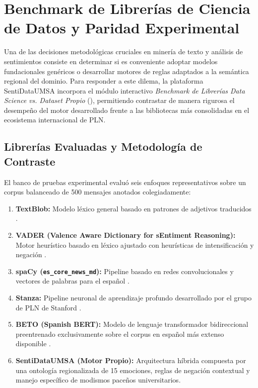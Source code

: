 \section{Benchmark de Librerías de Ciencia de Datos y Paridad Experimental}
\label{sec:benchmark_librerias}

Una de las decisiones metodológicas cruciales en minería de texto y análisis de sentimientos consiste en determinar si es conveniente adoptar modelos fundacionales genéricos o desarrollar motores de reglas adaptados a la semántica regional del dominio. Para responder a este dilema, la plataforma SentiDataUMSA incorpora el módulo interactivo \emph{Benchmark de Librerías Data Science vs. Dataset Propio} (), permitiendo contrastar de manera rigurosa el desempeño del motor desarrollado frente a las bibliotecas más consolidadas en el ecosistema internacional de PLN.

\subsection{Librerías Evaluadas y Metodología de Contraste}

El banco de pruebas experimental evaluó seis enfoques representativos sobre un corpus balanceado de 500 mensajes anotados colegiadamente:
\begin{enumerate}[label=\alph*)]
  \item \textbf{TextBlob:} Modelo léxico general basado en patrones de adjetivos traducidos \citep{loria2018textblob}.
  \item \textbf{VADER (Valence Aware Dictionary for sEntiment Reasoning):} Motor heurístico basado en léxico ajustado con heurísticas de intensificación y negación \citep{hutto2014vader}.
  \item \textbf{spaCy (\texttt{es\_core\_news\_md}):} Pipeline basado en redes convolucionales y vectores de palabras para el español \citep{honnibal2020spacy}.
  \item \textbf{Stanza:} Pipeline neuronal de aprendizaje profundo desarrollado por el grupo de PLN de Stanford \citep{qi2020stanza}.
  \item \textbf{BETO (Spanish BERT):} Modelo de lenguaje transformador bidireccional preentrenado exclusivamente sobre el corpus en español más extenso disponible \citep{canete2020beto}.
  \item \textbf{SentiDataUMSA (Motor Propio):} Arquitectura híbrida compuesta por una ontología regionalizada de 15 emociones, reglas de negación contextual y manejo específico de modismos paceños universitarios.
\end{enumerate}

